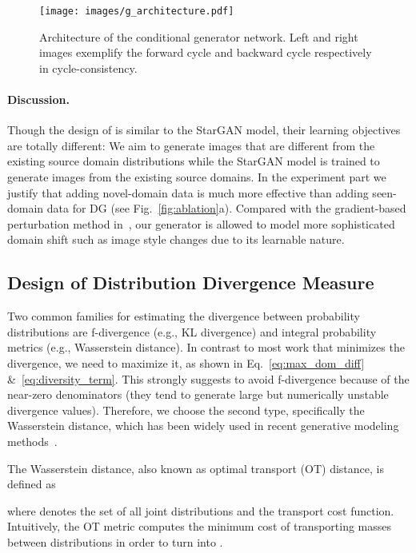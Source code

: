 \documentclass[runningheads]{llncs}
\begin{document}
\begin{figure}[t]
    \centering
    \texttt{[image: images/g\_architecture.pdf]}
    \caption{Architecture of the conditional generator network. Left and right images exemplify the forward cycle and backward cycle respectively in cycle-consistency.}
    \label{fig:g_architecture}
\end{figure}

\paragraph{Discussion.}
Though the design of  is similar to the StarGAN model, their learning objectives are totally different: We aim to generate images that are different from the existing source domain distributions while the StarGAN model is trained to generate images from the existing source domains. In the experiment part we justify that adding novel-domain data is much more effective than adding seen-domain data for DG (see Fig.~\ref{fig:ablation}a). Compared with the gradient-based perturbation method in~\cite{shankar2018generalizing}, our generator is allowed to model more sophisticated domain shift such as image style changes due to its learnable nature.

\subsection{Design of Distribution Divergence Measure} \label{subsec:design_d}
Two common families for estimating the divergence between probability distributions are f-divergence (e.g., KL divergence) and integral probability metrics (e.g., Wasserstein distance). In contrast to most work that minimizes the divergence, we need to maximize it, as shown in Eq.~\eqref{eq:max_dom_diff} \&~\eqref{eq:diversity_term}. This strongly suggests to avoid f-divergence because of the near-zero denominators (they tend to generate large but numerically unstable divergence values). Therefore, we choose the second type, specifically the Wasserstein distance, which has been widely used in recent generative modeling methods~\cite{WGAN,SinkhornAutoDiff,CramerDistance,salimans2018improving,SinGAN}.

The Wasserstein distance, also known as optimal transport (OT) distance, is defined as

where  denotes the set of all joint distributions  and  the transport cost function. Intuitively, the OT metric computes the minimum cost of transporting masses between distributions in order to turn  into .
\end{document}

